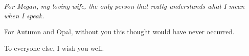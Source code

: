 %
%
\cleardoublepage
\thispagestyle{empty}
\null\vfill
\begin{center}
  \begin{minipage}{0.72\textwidth}
    \centering
    \itshape
    For Megan, my loving wife, the only person that really understands what I mean
    when I speak.

    \vspace{1.6em}

    For Autumn and Opal, without you this thought would have never occurred.

    \vspace{1.6em}

    To everyone else, I wish you well.
  \end{minipage}
\end{center}
\vfill\vfill
\cleardoublepage
